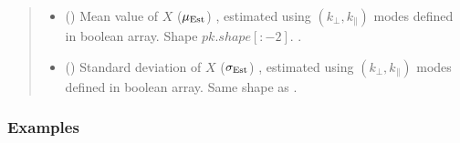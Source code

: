 \documentclass[a4paper,11pt,oneside,english,openany]{sphinxmanual}
\begin{document}
\begin{fulllineitems}
\begin{quote}
\begin{description}
\begin{itemize}
\item {} 
\sphinxAtStartPar
{} () \textendash{} Mean value of \(X\) (\(\mu_{\rm Est}\)) , estimated using \((k_{\perp},k_{\parallel})\) modes defined in  boolean array. Shape \(pk.shape[:-2]\). .

\item {} 
\sphinxAtStartPar
{} () \textendash{} Standard deviation of \(X\) (\(\sigma_{\rm Est}\)) , estimated using \((k_{\perp},k_{\parallel})\) modes defined in  boolean array. Same shape as .

\end{itemize}


\end{description}\end{quote}
\subsubsection*{Examples}


\end{fulllineitems}
\end{document}
